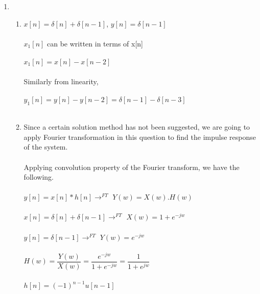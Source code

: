\documentclass[10pt,a4paper, margin=1in]{article}
\begin{document}
\begin{enumerate}
\item %
    \begin{enumerate}
    \item %
    $x[n]=\delta[n] + \delta[n-1]$, $y[n]=\delta[n-1]$ \\ \\
    $x_1[n]$ can be written in terms of x[n] \\ \\
    $x_1[n] = x[n] -x[n-2]$ \\ \\
    Similarly from linearity, \\ \\
    $y_1[n]=y[n]-y[n-2] = \delta[n-1] - \delta[n-3]$ \\ \\
    \item %
    Since a certain solution method has not been suggested, we are going to apply Fourier transformation in this question to find the impulse response of the system.\\\\
    Applying convolution property of the Fourier transform, we have the following.\\\\
    $y[n]=x[n]*h[n] \rightarrow^{FT}$  $Y(w) = X(w).H(w)$ \\ \\
    $x[n]=\delta[n]+\delta[n-1] \rightarrow^{FT}$ $X(w)=1+e^{-jw}$ \\ \\
    $y[n] = \delta[n-1] \rightarrow^{FT}$  $Y(w)=e^{-jw}$ \\ \\
    $H(w)=\dfrac{Y(w)}{X(w)} = \dfrac{e^{-jw}}{1+e^{-jw}} = \dfrac{1}{1+e^{jw}}$ \\ \\
    $h[n] = (-1)^{n-1}u[n-1]$ \\ \\




\end{enumerate}
\end{enumerate}
\end{document}
